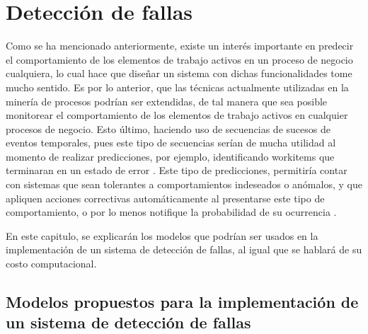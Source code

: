 \chapter{Detección de fallas}

\ifpdf
    \graphicspath{{Chapter3/Figs/Raster/}{Chapter3/Figs/PDF/}{Chapter3/Figs/}}
\else
    \graphicspath{{Chapter3/Figs/Vector/}{Chapter3/Figs/}}
\fi



Como se ha mencionado anteriormente, existe un interés importante en predecir el comportamiento de los elementos de trabajo activos en un proceso de negocio cualquiera, lo cual hace que diseñar un sistema con dichas funcionalidades tome mucho sentido. Es por lo anterior, que las técnicas actualmente utilizadas en la minería de procesos podrían ser extendidas, de tal manera que sea posible monitorear el comportamiento de los elementos de trabajo activos en cualquier procesos de negocio. Esto último, haciendo uso de secuencias de sucesos de eventos temporales, pues este tipo de secuencias serían de mucha utilidad al momento de realizar predicciones, por ejemplo, identificando workitems que terminaran en un estado de error \cite{Kang2014}. Este tipo de predicciones, permitiría contar con sistemas que sean tolerantes a comportamientos indeseados o anómalos, y que apliquen acciones correctivas automáticamente al presentarse este tipo de comportamiento, o por lo menos notifique la probabilidad de su ocurrencia \cite{Yu2006,Salfner2007}. 

En este capitulo, se explicarán los modelos que podrían ser usados en la implementación de un sistema de detección de fallas, al igual que se hablará de su costo computacional.

\section{Modelos propuestos para la implementación de un sistema de detección de fallas} %
\label{section3.1}

